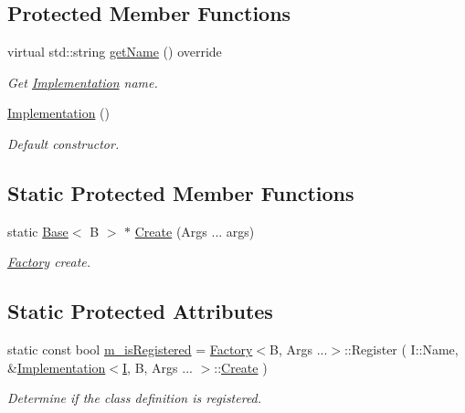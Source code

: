 \subsection*{Protected Member Functions}
\begin{DoxyCompactItemize}
\item 
virtual std\+::string \hyperlink{classUintah_1_1PhaseField_1_1Implementation_a115940ce50afb4e7a2a0a831a2a6577c}{get\+Name} () override
\begin{DoxyCompactList}\small\item\em Get \hyperlink{classUintah_1_1PhaseField_1_1Implementation}{Implementation} name. \end{DoxyCompactList}\item 
\hyperlink{classUintah_1_1PhaseField_1_1Implementation_a93c3a3fe8276accce230cfbdf623b1d0}{Implementation} ()
\begin{DoxyCompactList}\small\item\em Default constructor. \end{DoxyCompactList}\end{DoxyCompactItemize}
\subsection*{Static Protected Member Functions}
\begin{DoxyCompactItemize}
\item 
static \hyperlink{classUintah_1_1PhaseField_1_1Base}{Base}$<$ B $>$ $\ast$ \hyperlink{classUintah_1_1PhaseField_1_1Implementation_a411e1f5a60175c99fee000c0486e956c}{Create} (Args ... args)
\begin{DoxyCompactList}\small\item\em \hyperlink{classUintah_1_1PhaseField_1_1Factory}{Factory} create. \end{DoxyCompactList}\end{DoxyCompactItemize}
\subsection*{Static Protected Attributes}
\begin{DoxyCompactItemize}
\item 
static const bool \hyperlink{classUintah_1_1PhaseField_1_1Implementation_a8415e7c1b2e8aeebec083cf199f5a9c1}{m\+\_\+is\+Registered} = \hyperlink{classUintah_1_1PhaseField_1_1Factory}{Factory}$<$B, Args ...$>$\+::Register ( I\+::\+Name, \&\hyperlink{classUintah_1_1PhaseField_1_1Implementation}{Implementation}$<$\hyperlink{structUintah_1_1PhaseField_1_1I}{I}, B, Args ... $>$\+::\hyperlink{classUintah_1_1PhaseField_1_1Implementation_a411e1f5a60175c99fee000c0486e956c}{Create} )
\begin{DoxyCompactList}\small\item\em Determine if the class definition is registered. \end{DoxyCompactList}\end{DoxyCompactItemize}


